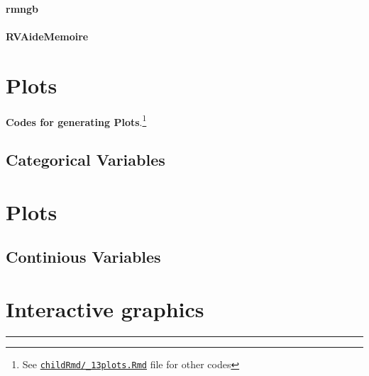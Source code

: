 \documentclass[
]{article}
\begin{document}
\begin{landscape}
{\paragraph{rmngb}\label{rmngb}}

\hypertarget{rvaidememoire}{%
\paragraph{RVAideMemoire}\label{rvaidememoire}}

\newpage
\begin{landscape}

\end{landscape}

\end{landscape}

\hypertarget{plots}{%
\section{Plots}\label{plots}}

\textbf{Codes for generating Plots}.\footnote{See
  \href{https://github.com/sbalci/histopathology-template/blob/master/childRmd/_13plots.Rmd}{\texttt{childRmd/\_13plots.Rmd}}
  file for other codes}

\hypertarget{categorical-variables-1}{%
\subsection{Categorical Variables}\label{categorical-variables-1}}

\hypertarget{plots-1}{%
\section{Plots}\label{plots-1}}

\hypertarget{continious-variables-1}{%
\subsection{Continious Variables}\label{continious-variables-1}}

\hypertarget{interactive}{%
\section{Interactive graphics}\label{interactive}}

\begin{center}\rule{0.5\linewidth}{0.5pt}\end{center}
\end{document}
